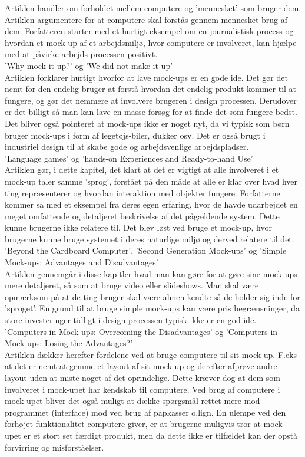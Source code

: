 \documentclass[12pt]{article}
\begin{document}
Artiklen handler om forholdet mellem computere og 'mennesket' som bruger dem. Artiklen argumentere for at computere skal forstås gennem mennesket brug af dem. Forfatteren starter med et hurtigt eksempel om en journalistisk process og hvordan et mock-up af et arbejdsmiljø, hvor computere er involveret, kan hjælpe med at påvirke arbejds-processen positivt.\\
'Why mock it up?' og 'We did not make it up'\\
Artiklen forklarer hurtigt hvorfor at lave mock-ups er en gode ide. Det gør det nemt for den endelig bruger at forstå hvordan det endelig produkt kommer til at fungere, og gør det nemmere at involvere brugeren i design processen. Derudover er det billigt så man kan lave en masse forsøg for at finde det som fungere bedst. Det bliver også pointeret at mock-ups ikke er noget nyt, da vi typisk som børn bruger mock-ups i form af legetøjs-biler, dukker osv. Det er også brugt i industriel design til at skabe gode og arbejdsvenlige arbejdspladser. \\
'Language games' og 'hands-on Experiences and Ready-to-hand Use'\\
Artiklen gør, i dette kapitel, det klart at det er vigtigt at alle involveret i et mock-up taler samme 'sprog', forstået på den måde at alle er klar over hvad hver ting repræsenterer og hvordan interaktion med objekter fungere. Forfatterne kommer så med et eksempel fra deres egen erfaring, hvor de havde udarbejdet en meget omfattende og detaljeret beskrivelse af det pågældende system. Dette kunne brugerne ikke relatere til. Det blev løst ved bruge et mock-up, hvor brugerne kunne bruge systemet i deres naturlige miljø og derved relatere til det.\\
'Beyond the Cardboard Computer', 'Second Generation Mock-ups' og 'Simple Mock-ups: Advantages and Disadvantages'\\
Artiklen gennemgår i disse kapitler hvad man kan gøre for at gøre sine mock-ups mere detaljeret, så som at bruge video eller slideshows. Man skal være opmærksom på at de ting bruger skal være almen-kendte så de holder sig inde for 'sproget'. En grund til at bruge simple mock-ups kan være pris begrænsninger, da store investeringer tidligt i design-processen typisk ikke er en god ide.\\
'Computers in Mock-ups: Overcoming the Disadvantages' og 'Computers in Mock-ups: Losing the Advantages?'\\
Artiklen dækker herefter fordelene ved at bruge computere til sit mock-up. F.eks at det er nemt at gemme et layout af sit mock-up og derefter afprøve andre layout uden at miste noget af det oprindelige. Dette kræver dog at dem som involveret i mock-upet har kendskab til computere. Ved brug af computere i mock-upet bliver det også muligt at dække spørgsmål rettet mere mod programmet (interface) mod ved brug af papkasser o.lign. En ulempe ved den forhøjet funktionalitet computere giver, er at brugerne muligvis tror at mock-upet er et stort set færdigt produkt, men da dette ikke er tilfældet kan der opstå forvirring og misforståelser.\\
\end{document}
